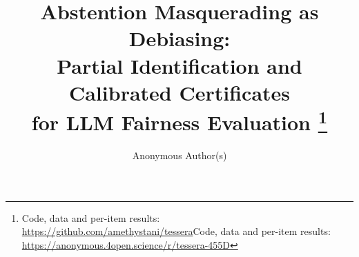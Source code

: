 \documentclass[11pt]{article}
\title{Abstention Masquerading as Debiasing:\\Partial Identification and Calibrated Certificates\\for LLM Fairness Evaluation
  \thanks{\ifshowrepo Code, data and per-item results: \url{https://github.com/amethystani/tessera}\else Code, data and per-item results: \url{https://anonymous.4open.science/r/tessera-455D}\fi}}
\author{Anonymous Author(s)}
\begin{document}
\maketitle














{\raggedright

}

\appendix







\end{document}
